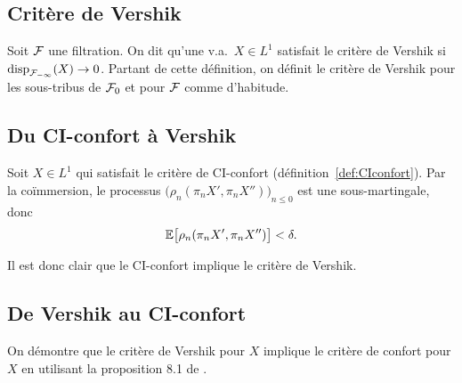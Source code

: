\documentclass[12pt,a4paper]{article}
\begin{document}
\subsection{Critère de Vershik}

\begin{definition}
Soit $\mathcal{F}$ une filtration. On dit qu'une v.a.\ $X \in L^1$ 
satisfait le critère de Vershik si $\textrm{disp}_{\mathcal{F}_{-\infty}}(X) \to 0$.
Partant de cette définition, on 
 définit le critère de Vershik pour les sous-tribus de $\mathcal{F}_0$ et pour $\mathcal{F}$ 
comme d'habitude. 
\end{definition}

\subsection{Du CI-confort à Vershik}

Soit $X \in L^1$ qui satisfait le critère de CI-confort (définition~\ref{def:CIconfort}). 
Par la co\"immersion, le processus ${\bigl(\rho_n(\pi_n X', \pi_n X'')\bigr)}_{n \leq 0}$ 
est une sous-martingale, donc 
$$
\mathbb{E}\bigl[ \rho_n(\pi_n X', \pi_n X'') \bigr] < \delta. 
$$

Il est donc clair que le CI-confort implique le critère de Vershik. 


\subsection{De Vershik au CI-confort}

On démontre que le critère de Vershik pour $X$ implique le critère de confort 
pour $X$ en utilisant la proposition 8.1 de \cite{LauTeoriya}. 
\end{document}
